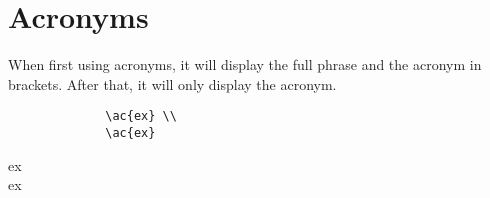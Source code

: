 \section{Acronyms}

When first using acronyms, it will display the full phrase and the acronym in brackets. After that, it will only display the acronym.\\

\begin{figure}[ht]
    \begin{verbatim}
        \ac{ex} \\ 
        \ac{ex}
    \end{verbatim}
\end{figure}

\noindent
\ac{ex} \\
\ac{ex}